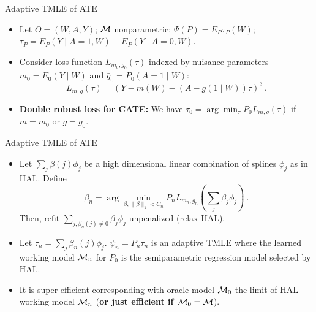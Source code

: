 \documentclass[t]{beamer}
\begin{document}
\begin{frame}{Adaptive TMLE of ATE}
\begin{itemize}
\item Let $O=(W,A,Y)$; ${\cal M}$ nonparametric; $\Psi(P)=E_P\tau_P(W)$; $\tau_P=E_P(Y\mid A=1,W)-E_P(Y\mid A=0,W)$.
\item Consider loss function $L_{m_0,g_0}(\tau)$ indexed by nuisance parameters $m_0=E_0(Y\mid W)$ and $\bar{g}_0=P_0(A=1\mid W)$:
\[
  L_{m,g}(\tau)=\left(Y - m(W) - (A - g(1\mid W))\tau\right)^2 \ .
\]
\item {\bf Double robust loss for CATE:} We have $\tau_0=\arg\min_{\tau}P_0 L_{m,g}(\tau)$ if $m=m_0$ or $g=g_0$. 
\end{itemize}
\end{frame}

\begin{frame}{Adaptive TMLE of ATE}
\begin{itemize}
\item Let $\sum_j\beta(j)\phi_j$ be a high dimensional linear combination of splines $\phi_j$ as in HAL. Define
\[
\beta_n=\arg\min_{\beta, \lVert \beta \rVert_{1} < C_n} P_n L_{m_n,g_n}\left(\sum_j \beta_j\phi_j\right) \ .
\]
Then, refit $\sum_{j,\beta_n(j)\not =0}\beta_j\phi_j$ unpenalized (relax-HAL). 
\item Let $\tau_n=\sum_j\beta_n(j)\phi_j$. $\psi_n=P_n \tau_n$ is an adaptive TMLE  where the learned working model ${\cal M}_n$ for $P_0$ is the semiparametric regression model selected by HAL.
\item It is super-efficient corresponding with oracle model ${\cal M}_0$ the limit of HAL-working model ${\cal M}_n$ ({\bf or just efficient if ${\cal M}_0={\cal M}$}).
\end{itemize}
\end{frame}
\end{document}
